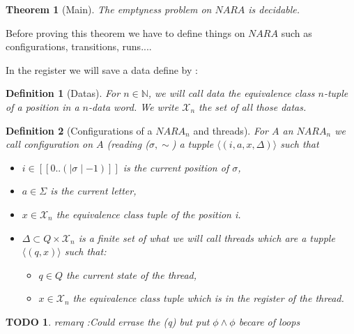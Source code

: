 \documentclass[a4paper,10pt]{report}
\newtheorem{thr}{Theorem} %
\newtheorem{df}{Definition}
\newtheorem{td}{TODO}
\newcommand{\seg}[1]{[\![#1]\!]}
\newcommand{\segw}[1]{\seg{0..(\mid #1\mid -1)}}
\newcommand{\X}{\mathcal{X}_{n}}
\begin{document}
\begin{thr}[Main]
  \label{main}
 The emptyness problem on $NARA$ is decidable.
\end{thr}


Before proving this theorem we have to define things on $NARA$ such as configurations, transitions, runs....


In the register we will save a data define by :  
\begin{df}[Datas]
  For $n\in \mathbb N$, we will call data the equivalence class $n$-tuple of a position in a $n$-data word.
  We write $\X$ the set of all those datas.
\end{df}

\begin{df}[Configurations of a $NARA_n$ and threads]
For $A$ an $NARA_n$ we call configuration on $A$ (reading ($\sigma,\sim$) a tupple  
 $\langle ( i,a ,x, \Delta  )  \rangle$
 such that 
  \begin{itemize}
    \item $i \in \segw{\sigma }$ is the current position of $\sigma$,
    \item $a \in \Sigma$ is the current letter, 
    \item $x\in  \X$ the equivalence class tuple of the position i.
    \item $\Delta \subset Q \times \X$ is a finite set of what we will call threads which are a tupple  
    $\langle (q,x)  \rangle$ such that:
      \begin{itemize}
	\item $q \in Q$ the current state of the thread,
	\item $x\in  \X $ the equivalence class tuple which is in the register of the thread.
      \end{itemize}
   \end{itemize}
\end{df}

\begin{td}
 remarq :Could errase the (q) but put $ \phi \wedge \phi$ becare of loops
\end{td}
\end{document}
